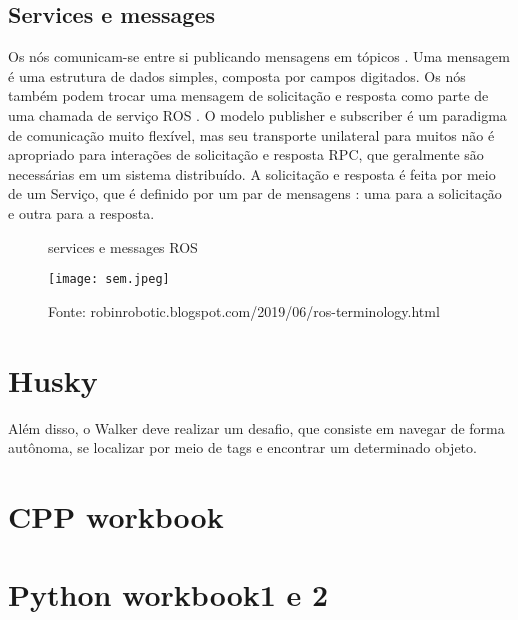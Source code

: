 \subsection{Services e messages}
Os nós comunicam-se entre si publicando mensagens em tópicos . Uma mensagem é uma estrutura de dados simples, composta por campos digitados.
Os nós também podem trocar uma mensagem de solicitação e resposta como parte de uma chamada de serviço ROS .
O modelo publisher e subscriber é um paradigma de comunicação muito flexível, mas seu transporte unilateral para muitos não é apropriado
para interações de solicitação e resposta RPC, que geralmente são necessárias em um sistema distribuído. 
A solicitação e resposta é feita por meio de um Serviço, que é definido por um par de mensagens : uma para a solicitação e outra para a resposta.
\begin{figure} [h!]	
   \centering
   \caption{services e messages ROS}
   \texttt{[image: sem.jpeg]}
   \caption*{Fonte: robinrobotic.blogspot.com/2019/06/ros-terminology.html}
   \label{fig:servicesemessages}
\end{figure}	
 \section{Husky}
 Além disso, o Walker deve realizar um desafio, que consiste em navegar de forma autônoma, se localizar por meio de tags e encontrar um determinado objeto.
 \section{CPP workbook}
 \section{Python workbook1 e 2}




